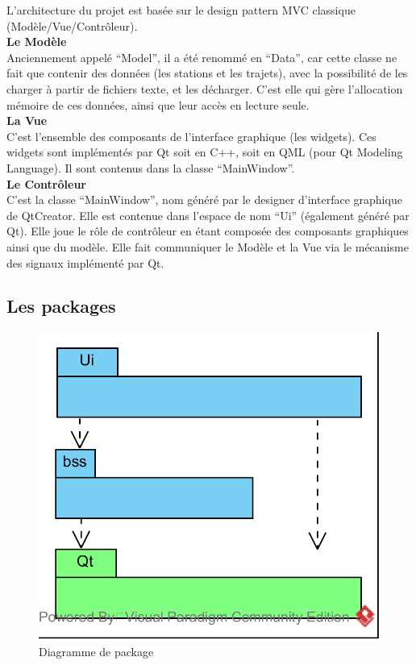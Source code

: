 \documentclass[12pt]{article}
\begin{document}
		L’architecture du projet est basée sur le design pattern MVC classique
		(Modèle/Vue/Contrôleur).\\
		
		\textbf{Le Modèle}\\
		Anciennement appelé “Model”, il a été renommé en “Data”, car cette classe ne fait
		que contenir des données (les stations et les trajets), avec la possibilité de les
		charger à partir de fichiers texte, et les décharger. C’est elle qui gère
		l’allocation mémoire de ces données, ainsi que leur accès en lecture seule.\\
		
		\textbf{La Vue}\\
		C’est l’ensemble des composants de l’interface graphique (les widgets). Ces widgets
		sont implémentés par Qt soit en C++, soit en QML (pour Qt Modeling Language). Il sont
		contenus dans la classe “MainWindow”.\\
				
		\textbf{Le Contrôleur}\\
		C’est la classe “MainWindow”, nom généré par le designer d’interface graphique de
		QtCreator. Elle est contenue dans l’espace de nom “Ui” (également généré par Qt).
		Elle joue le rôle de contrôleur en étant composée des composants graphiques ainsi que
		du modèle. Elle fait communiquer le Modèle et la Vue via le mécanisme des signaux
		implémenté par Qt.\\
			
		\subsection{Les packages}
		\begin{figure}[!h]
		\begin{center}
		\includegraphics[scale=1]{dia_package.png}
		\caption{Diagramme de package}
		\label{fig:dia_package}
		\end{center}
		\end{figure}		
		
\end{document}
